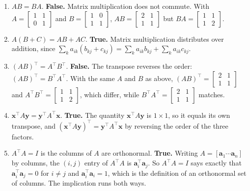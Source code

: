 \documentclass[11pt]{article}
\begin{document}
\begin{enumerate}
  \item $AB = BA$. \textbf{False.} Matrix multiplication does not commute. With
        $A = \begin{bmatrix} 1&1\\0&1\end{bmatrix}$ and $B = \begin{bmatrix} 1&0\\1&1\end{bmatrix}$,
        $AB = \begin{bmatrix} 2&1\\1&1\end{bmatrix}$ but $BA = \begin{bmatrix} 1&1\\1&2\end{bmatrix}$.

  \item $A(B+C) = AB + AC$. \textbf{True.} Matrix multiplication distributes over addition, since
        $\sum_k a_{ik}(b_{kj} + c_{kj}) = \sum_k a_{ik}b_{kj} + \sum_k a_{ik}c_{kj}$.

  \item $(AB)^\top = A^\top B^\top$. \textbf{False.} The transpose reverses the order:
        $(AB)^\top = B^\top A^\top$. With the same $A$ and $B$ as above,
        $(AB)^\top = \begin{bmatrix} 2&1\\1&1\end{bmatrix}$ and
        $A^\top B^\top = \begin{bmatrix} 1&1\\1&2\end{bmatrix}$, which differ, while
        $B^\top A^\top = \begin{bmatrix} 2&1\\1&1\end{bmatrix}$ matches.

  \item $\mathbf{x}^\top A \mathbf{y} = \mathbf{y}^\top A^\top \mathbf{x}$. \textbf{True.} The quantity
        $\mathbf{x}^\top A \mathbf{y}$ is $1 \times 1$, so it equals its own transpose, and
        $(\mathbf{x}^\top A \mathbf{y})^\top = \mathbf{y}^\top A^\top \mathbf{x}$ by reversing the order
        of the three factors.

  \item $A^\top A = I$ is the columns of $A$ are orthonormal. \textbf{True.} Writing
        $A = [\mathbf{a}_1 \cdots \mathbf{a}_n]$ by columns, the $(i,j)$ entry of $A^\top A$ is
        $\mathbf{a}_i^\top\mathbf{a}_j$. So $A^\top A = I$ says exactly that
        $\mathbf{a}_i^\top\mathbf{a}_j = 0$ for $i \ne j$ and $\mathbf{a}_i^\top\mathbf{a}_i = 1$, which is
        the definition of an orthonormal set of columns. The implication runs both ways.
\end{enumerate}
\end{document}
